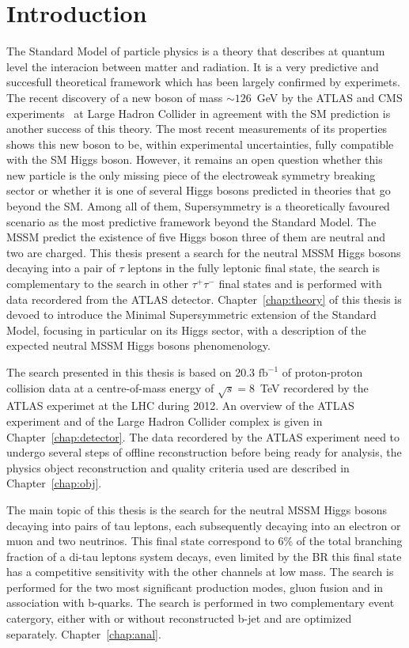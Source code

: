 \chapter{Introduction}

 
The Standard Model of particle physics is a theory that describes at quantum level the interacion 
between matter and radiation. It is a very predictive and succesfull theoretical framework
which has been largely confirmed by experimets.  The recent discovery of a new boson of mass
$\sim 126$~GeV by the ATLAS and CMS experiments~\cite{AHiggsO,CHiggsO} at Large Hadron Collider 
in agreement with the SM prediction is another success of this theory.
The most recent measurements \cite{ASpin0,ACouplings,CFermions,CWidth} of its
properties shows this new boson to be, within experimental uncertainties, fully
compatible with the SM Higgs boson. However, it remains an open question
whether this new particle is the only missing piece of the electroweak symmetry breaking
sector or whether it is one of several Higgs bosons predicted in  theories 
that go beyond the SM. Among all of them, Supersymmetry  is a theoretically favoured scenario
as the most predictive framework beyond the Standard Model. 
The MSSM predict the existence of five Higgs boson three of them are neutral and two are charged. 
This thesis present a search for the neutral MSSM Higgs bosons decaying into a pair of $\tau$ leptons in the fully leptonic
final state, the search is complementary to the search in other $\tau^+\tau^-$ final states and is  performed with 
data recordered from the ATLAS detector.
Chapter~\ref{chap:theory} of this thesis 
is devoed to introduce the Minimal Supersymmetric extension of the Standard Model, focusing 
in particular on its Higgs sector, with a description of the expected neutral MSSM Higgs bosons
phenomenology.

The search presented in this thesis is based on 20.3 $\text{fb}^{-1}$ of proton-proton collision data at 
a centre-of-mass energy of $\sqrt{s} = 8$~TeV recordered by the ATLAS experimet at the LHC during 2012.
An overview of the ATLAS experiment and of the Large Hadron Collider complex is given in Chapter~\ref{chap:detector}. 
The data recordered by the ATLAS experiment need to undergo several steps of offline reconstruction 
before being ready for analysis, the physics object reconstruction and quality criteria used are described in 
Chapter~\ref{chap:obj}.

The main topic of this thesis is the search for the neutral MSSM Higgs bosons decaying into pairs of tau leptons,
each subsequently decaying into an electron or muon and two neutrinos.
This final state correspond to 6\% of the total branching fraction of a di-tau leptons system decays, even limited by the BR
this final state has a competitive sensitivity with the other channels at low mass.
The search is performed for the two most significant production modes, gluon fusion and in association with
b-quarks. The search is performed in two complementary event catergory, either with or without reconstructed b-jet
and are optimized separately. Chapter~\ref{chap:anal}.

